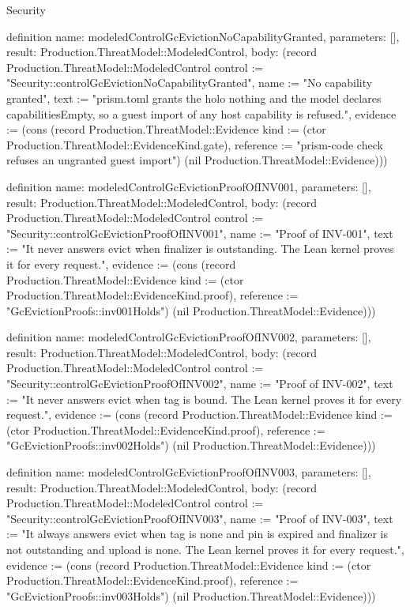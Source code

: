 \begin{lexlean}{Security}
\begin{semanticmodule}
definition{
  name: modeledControlGcEvictionNoCapabilityGranted,
  parameters: [],
  result: Production.ThreatModel::ModeledControl,
  body: (record Production.ThreatModel::ModeledControl {control := "Security::controlGcEvictionNoCapabilityGranted", name := "No capability granted", text := "prism.toml grants the holo nothing and the model declares capabilitiesEmpty, so a guest import of any host capability is refused.", evidence := (cons (record Production.ThreatModel::Evidence {kind := (ctor Production.ThreatModel::EvidenceKind.gate), reference := "prism-code check refuses an ungranted guest import"}) (nil Production.ThreatModel::Evidence))})
}

definition{
  name: modeledControlGcEvictionProofOfINV001,
  parameters: [],
  result: Production.ThreatModel::ModeledControl,
  body: (record Production.ThreatModel::ModeledControl {control := "Security::controlGcEvictionProofOfINV001", name := "Proof of INV-001", text := "It never answers evict when finalizer is outstanding. The Lean kernel proves it for every request.", evidence := (cons (record Production.ThreatModel::Evidence {kind := (ctor Production.ThreatModel::EvidenceKind.proof), reference := "GcEvictionProofs::inv001Holds"}) (nil Production.ThreatModel::Evidence))})
}

definition{
  name: modeledControlGcEvictionProofOfINV002,
  parameters: [],
  result: Production.ThreatModel::ModeledControl,
  body: (record Production.ThreatModel::ModeledControl {control := "Security::controlGcEvictionProofOfINV002", name := "Proof of INV-002", text := "It never answers evict when tag is bound. The Lean kernel proves it for every request.", evidence := (cons (record Production.ThreatModel::Evidence {kind := (ctor Production.ThreatModel::EvidenceKind.proof), reference := "GcEvictionProofs::inv002Holds"}) (nil Production.ThreatModel::Evidence))})
}

definition{
  name: modeledControlGcEvictionProofOfINV003,
  parameters: [],
  result: Production.ThreatModel::ModeledControl,
  body: (record Production.ThreatModel::ModeledControl {control := "Security::controlGcEvictionProofOfINV003", name := "Proof of INV-003", text := "It always answers evict when tag is none and pin is expired and finalizer is not outstanding and upload is none. The Lean kernel proves it for every request.", evidence := (cons (record Production.ThreatModel::Evidence {kind := (ctor Production.ThreatModel::EvidenceKind.proof), reference := "GcEvictionProofs::inv003Holds"}) (nil Production.ThreatModel::Evidence))})
}


\end{semanticmodule}
\end{lexlean}
